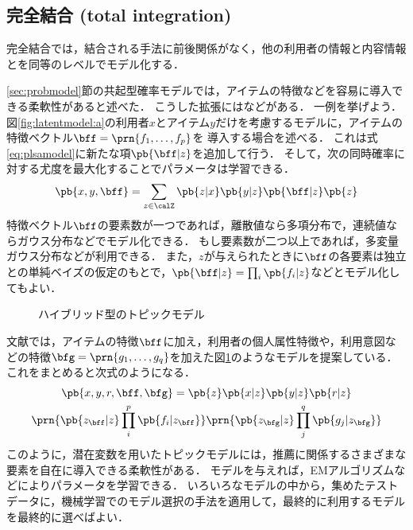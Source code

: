 

\subsection{完全結合 (total integration)}

完全結合では，結合される手法に前後関係がなく，他の利用者の情報と内容情報とを同等のレベルでモデル化する．

\ref{sec:probmodel}節の共起型確率モデルでは，アイテムの特徴などを容易に導入できる柔軟性があると述べた．
こうした拡張には\cite{uai:01:01,ijcai:05:01,trieice:06:04,tripsj:06:02,tieice:07:02}などがある．
一例を挙げよう．
図\ref{fig:latentmodel:a}の利用者$x$とアイテム$y$だけを考慮するモデルに，アイテムの特徴ベクトル$\bff=\prn{f_1,\dotsc,f_p}$を
導入する場合を述べる．
これは式\eqref{eq:plsamodel}に新たな項$\pb{\bff|z}$を追加して行う．
そして，次の同時確率に対する尤度を最大化することでパラメータは学習できる．
\[
 \pb{x,y,\bff} = \sum_{z\in\calZ} \pb{z|x} \pb{y|z}\pb{\bff|z}\pb{z}
\]
特徴ベクトル$\bff$の要素数が一つであれば，離散値なら多項分布で，連続値ならガウス分布などでモデル化できる．
もし要素数が二つ以上であれば，多変量ガウス分布などが利用できる．
また，$z$が与えられたときに$\bff$の各要素は独立との単純ベイズの仮定のもとで，$\pb{\bff|z}=\prod_i\pb{f_i|z}$などとモデル化してもよい．

\begin{figure}
\centering
{}
\caption{ハイブリッド型のトピックモデル\cite{trieice:06:04}}
\label{fig:combined-topicmodel}
\end{figure}

文献\cite{trieice:06:04}では，アイテムの特徴$\bff$に加え，利用者の個人属性特徴や，利用意図などの特徴$\bfg=\prn{g_1,\dotsc,g_q}$を加えた図\ref{fig:combined-topicmodel}のようなモデルを提案している．
これをまとめると次式のようになる．
\begin{multline*}
\pb{x,y,r,\bff,\bfg} =
 \pb{z}\pb{x|z}\pb{y|z}\pb{r|z}\\
\prn{\pb{z_\bff|z}\prod_i^p\pb{f_i|z_\bff}}
\prn{\pb{z_\bfg|z}\prod_j^q\pb{g_j|z_\bfg}}
\end{multline*}
%
このように，潜在変数を用いたトピックモデルには，推薦に関係するさまざまな要素を自在に導入できる柔軟性がある．
モデルを与えれば，EMアルゴリズムなどによりパラメータを学習できる．
いろいろなモデルの中から，集めたテストデータに，機械学習でのモデル選択の手法を適用して，最終的に利用するモデルを最終的に選べばよい．

